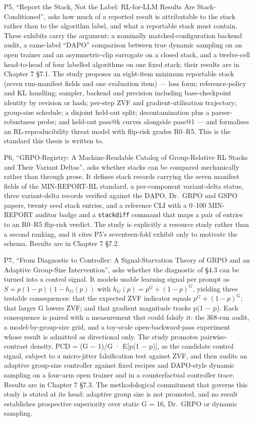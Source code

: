 \documentclass[12pt,a4paper]{report}
\begin{document}
P5, ``Report the Stack, Not the Label: RL-for-LLM Results Are
Stack-Conditioned'', asks how much of a reported result is attributable
to the stack rather than to the algorithm label, and what a reportable
stack must contain. Three exhibits carry the argument: a nominally
matched-configuration backend audit, a same-label ``DAPO'' comparison
between true dynamic sampling on an open trainer and an asymmetric-clip
surrogate on a closed stack, and a twelve-cell head-to-head of four
labelled algorithms on one fixed stack; their results are in Chapter 7
§7.1. The study proposes an eight-item minimum reportable stack (seven
run-manifest fields and one evaluation item) --- loss form;
reference-policy and KL handling; sampler, backend and precision
including base-checkpoint identity by revision or hash; per-step ZVF and
gradient-utilisation trajectory; group-size schedule; a disjoint
held-out split; decontamination plus a parser-robustness probe; and
held-out pass@k curves alongside pass@1 --- and formalises an
RL-reproducibility threat model with flip-risk grades R0--R5. This is
the standard this thesis is written to.

P6, ``GRPO-Registry: A Machine-Readable Catalog of Group-Relative RL
Stacks and Their Variant Deltas'', asks whether stacks can be compared
mechanically rather than through prose. It defines stack records
carrying the seven manifest fields of the MIN-REPORT-RL standard, a
per-component variant-delta status, three variant-delta records verified
against the DAPO, Dr.~GRPO and GSPO papers, twenty seed stack entries,
and a reference CLI with a 0--100 MIN-REPORT auditor badge and a
\texttt{stackdiff} command that maps a pair of entries to an R0--R5
flip-risk verdict. The study is explicitly a resource study rather than
a second ranking, and it cites P5's seventeen-fold exhibit only to
motivate the schema. Results are in Chapter 7 §7.2.

P7, ``From Diagnostic to Controller: A Signal-Starvation Theory of GRPO
and an Adaptive Group-Size Intervention'', asks whether the diagnostic
of §4.3 can be turned into a control signal. It models usable learning
signal per prompt as \(S = p(1-p)(1-h_G(p))\) with
\(h_G(p) = p^G + (1-p)^G\), yielding three testable consequences: that
the expected ZVF indicator equals \(p^G + (1-p)^G\); that larger G
lowers ZVF; and that gradient magnitude tracks p(1 − p). Each
consequence is paired with a measurement that could falsify it: the
368-run audit, a model-by-group-size grid, and a toy-scale
open-backward-pass experiment whose result is admitted as directional
only. The study promotes pairwise-contrast density, PCD = (G − 1)/G ·
E{[}p(1 − p){]}, as the candidate control signal, subject to a
micro-jitter falsification test against ZVF, and then audits an adaptive
group-size controller against fixed recipes and DAPO-style dynamic
sampling on a four-arm open trainer and in a counterfactual controller
trace. Results are in Chapter 7 §7.3. The methodological commitment that
governs this study is stated at its head: adaptive group size is not
promoted, and no result establishes prospective superiority over static
G = 16, Dr.~GRPO or dynamic sampling.
\end{document}
